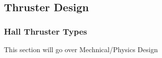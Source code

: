 \subsection{Thruster Design}

\subsubsection{Hall Thruster Types}

This section will go over Mechnical/Physics Design